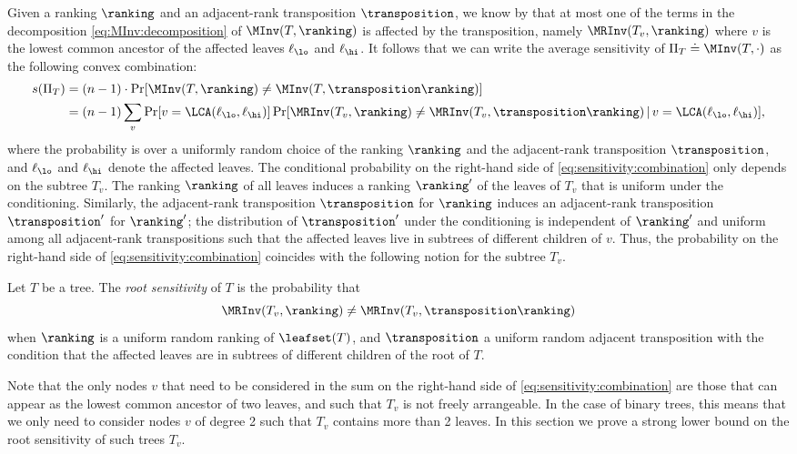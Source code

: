 \documentclass{toc}
\begin{document}
Given a ranking $\ranking$ and an adjacent-rank transposition $\transposition$, we know by  that at most one of the terms in the decomposition \eqref{eq:MInv:decomposition} of $\MInv(T,\ranking)$ is affected by the transposition, namely $\MRInv(T_v,\ranking)$ where $v$ is the lowest common ancestor of the affected leaves $\ell_\lo$ and $\ell_\hi$. It follows that we can write the average sensitivity of $\Pi_T \doteq \MInv(T,\cdot)$ as the following convex combination:
\begin{align}\label{eq:sensitivity:combination}
s(\Pi_T) & = (n-1) \cdot \Pr[ \MInv(T,\ranking) \ne \MInv(T,\transposition \ranking)] \nonumber \\
& = (n-1) \sum_v \Pr[ v = \LCA(\ell_\lo,\ell_\hi) ] \Pr[ \MRInv(T_v,\ranking) \ne \MRInv(T_v,\transposition \ranking) \, | \, 
v = \LCA(\ell_\lo,\ell_\hi)], 
\end{align}
where the probability is over a uniformly random choice of the ranking $\ranking$ and the adjacent-rank transposition $\transposition$, and $\ell_\lo$ and $\ell_\hi$ denote the affected leaves. The conditional probability on the right-hand side of \eqref{eq:sensitivity:combination} only depends on the subtree $T_v$. The ranking $\ranking$ of all leaves induces a ranking $\ranking'$ of the leaves of $T_v$ that is uniform under the conditioning. Similarly, the adjacent-rank transposition $\transposition$ for $\ranking$ induces an adjacent-rank transposition $\transposition'$ for $\ranking'$; the distribution of $\transposition'$ under the conditioning is independent of $\ranking'$ and uniform among all adjacent-rank transpositions such that the affected leaves live in subtrees of different children of $v$. Thus, the probability on the right-hand side of \eqref{eq:sensitivity:combination} coincides with the following notion for the subtree $T_v$.
\begin{definition}\label{def:root-sensitivity}
Let $T$ be a tree. The \emph{root sensitivity} of $T$ is the probability that 
\[\MRInv(T_v,\ranking) \ne \MRInv(T_v,\transposition \ranking)\] 
when $\ranking$ is a uniform random  ranking of $\leafset(T)$, and $\transposition$ a uniform random adjacent transposition with the condition that the affected leaves are in subtrees of different children of the root of $T$.
\end{definition}
Note that the only nodes $v$ that need to be considered in the sum  on the right-hand side of \eqref{eq:sensitivity:combination} are those that can appear as the lowest common ancestor of two leaves, and such that $T_v$ is not freely arrangeable. In the case of binary trees, this means that we only need to consider nodes $v$ of degree 2 such that $T_v$ contains more than 2 leaves. In this section we prove a strong lower bound on the root sensitivity of such trees $T_v$.
\end{document}
